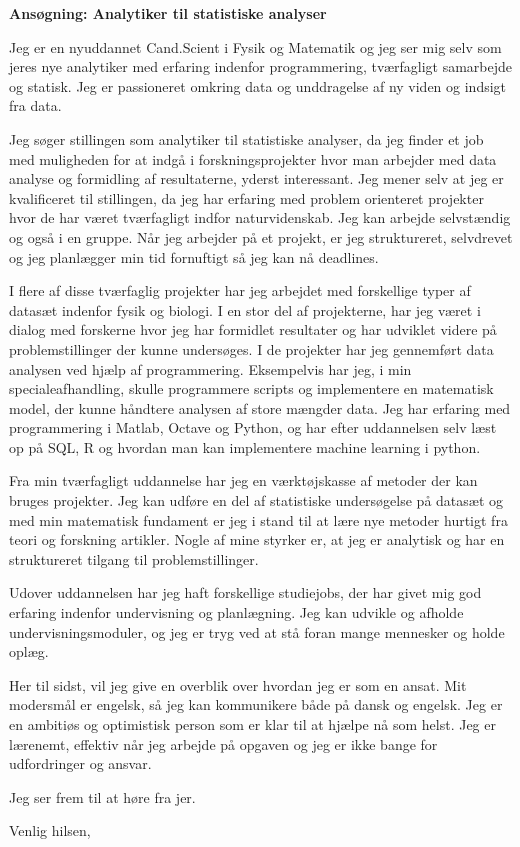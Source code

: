 \documentclass[12pt,a4paper]{letter}
\begin{document}
\begin{letter}{}
\opening{\textbf{Ansøgning: Analytiker til statistiske analyser}} 

Jeg er en nyuddannet Cand.Scient i Fysik og Matematik og jeg ser mig selv som jeres nye analytiker med erfaring indenfor programmering, tværfagligt samarbejde og statisk. Jeg er passioneret omkring data og unddragelse af ny viden og indsigt fra data. 

Jeg søger stillingen som analytiker til statistiske analyser, da jeg finder et job med muligheden for at indgå i forskningsprojekter hvor man arbejder med data analyse og formidling af resultaterne, yderst interessant. Jeg mener selv at jeg er kvalificeret til stillingen, da jeg har erfaring med problem orienteret projekter hvor de har været tværfagligt indfor naturvidenskab. Jeg kan arbejde selvstændig og også i en gruppe. Når jeg arbejder på et projekt, er jeg struktureret, selvdrevet og jeg planlægger min tid fornuftigt så jeg kan nå deadlines.      

I flere af disse tværfaglig projekter har jeg arbejdet med forskellige typer af datasæt indenfor fysik og biologi. I en stor del af projekterne, har jeg været i dialog med forskerne hvor jeg har formidlet resultater og har udviklet videre på problemstillinger der kunne undersøges. I de projekter har jeg gennemført data analysen ved hjælp af programmering. Eksempelvis har jeg, i min specialeafhandling, skulle programmere scripts og implementere en matematisk model, der kunne håndtere analysen af store mængder data. Jeg har erfaring med programmering i Matlab, Octave og Python, og har efter uddannelsen selv læst op på SQL, R og hvordan man kan implementere machine learning i python. 

Fra min tværfagligt uddannelse har jeg en værktøjskasse af metoder der kan bruges projekter. Jeg kan udføre en del af statistiske undersøgelse på datasæt og med min matematisk fundament er jeg i stand til at lære nye metoder hurtigt fra teori og forskning artikler. Nogle af mine styrker er, at jeg er analytisk og har en struktureret tilgang til problemstillinger. 
 
Udover uddannelsen har jeg haft forskellige studiejobs, der har givet mig god erfaring indenfor undervisning og planlægning. Jeg kan udvikle og afholde undervisningsmoduler, og jeg er tryg ved at stå foran mange mennesker og holde oplæg.

Her til sidst, vil jeg give en overblik over hvordan jeg er som en ansat. Mit modersmål er engelsk, så jeg kan kommunikere både på dansk og engelsk. Jeg er en ambitiøs og optimistisk person som er klar til at hjælpe nå som helst. Jeg er lærenemt, effektiv når jeg arbejde på opgaven og jeg er ikke bange for udfordringer og ansvar. 

Jeg ser frem til at høre fra jer.
\closing{Venlig hilsen,}

\end{letter}
\end{document}
